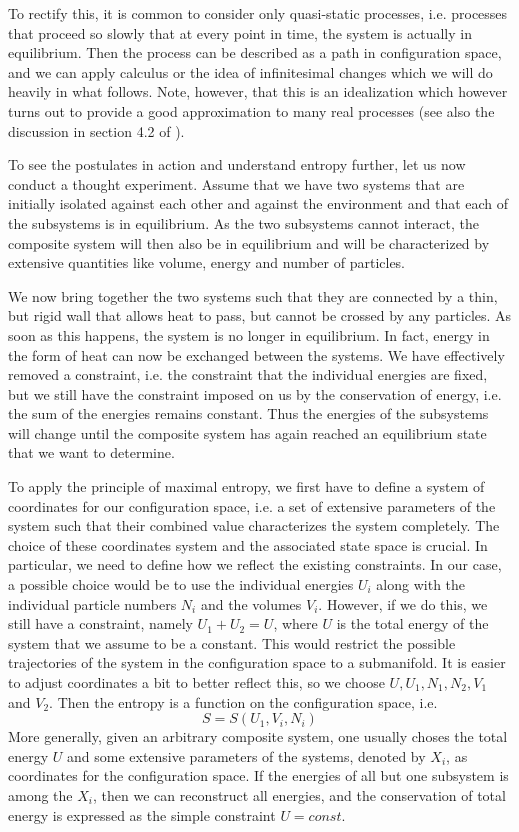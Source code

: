 \documentclass[a4paper, draft]{report}
\numberwithin{section}{chapter}
\numberwithin{equation}{chapter}
\theoremstyle{own}
\theoremstyle{remark}
\begin{document}
To rectify this, it is common to consider only quasi-static processes, i.e. processes that proceed so slowly that at every point in time, the system is actually in equilibrium. Then the process can be described as a path in configuration space, and we can apply calculus or the idea of infinitesimal changes which we will do heavily in what follows. Note, however, that this is an idealization which however turns out to provide a good approximation to many real processes (see also the discussion in section 4.2 of \cite{Callen}).

To see the postulates in action and understand entropy further, let us now conduct a thought experiment. Assume that we have two systems that are initially isolated against each other and against the environment and that each of the subsystems is in equilibrium. As the two subsystems cannot interact, the composite system will then also be in equilibrium and will be characterized by extensive quantities like volume, energy and number of particles.

We now bring together the two systems such that they are connected by a thin, but rigid wall that allows heat to pass, but cannot be crossed by any particles. As soon as this happens, the system is no longer in equilibrium. In fact, energy in the form of heat can now be exchanged between the systems. We have effectively removed a constraint, i.e. the constraint that the individual energies are fixed, but we still have the constraint imposed on us by the conservation of energy, i.e. the sum of the energies remains constant. Thus the energies of the subsystems will change until the composite system has again reached an equilibrium state that we want to determine.

To apply the principle of maximal entropy, we first have to define a system of coordinates for our configuration space, i.e. a set of extensive parameters of the system such that their combined value characterizes the system completely. The choice of these coordinates system and the associated state space is crucial. In particular, we need to define how we reflect the existing constraints. In our case, a possible choice would be to use the individual energies $U_i$ along with the individual particle numbers $N_i$ and the volumes $V_i$. However, if we do this, we still have a constraint, namely $U_1 + U_2 = U$, where $U$ is the total energy of the system that we assume to be a constant. This would restrict the possible trajectories of the system in the configuration space to a submanifold. It is easier to adjust coordinates a bit to better reflect this, so we choose $U, U_1, N_1, N_2, V_1$ and $V_2$. Then the entropy is a function on the configuration space, i.e.
$$
S = S(U_1, V_i, N_i)
$$
More generally, given an arbitrary composite system, one usually choses the total energy $U$ and some extensive parameters of the systems, denoted by $X_i$, as coordinates for the configuration space. If the energies of all but one subsystem is among the $X_i$, then we can reconstruct all energies, and the conservation of total energy is expressed as the simple constraint $U = const$.
\end{document}
